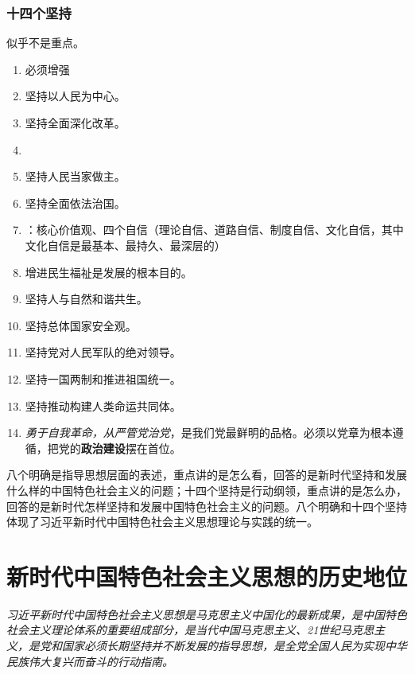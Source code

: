         \subsubsection{十四个坚持}
        似乎不是重点。
        \begin{enumerate}
            \item {}必须增强
            \item 坚持以人民为中心。
            \item 坚持全面深化改革。
            \item {}
            \item 坚持人民当家做主。
            \item 坚持全面依法治国。
            \item {}：核心价值观、四个自信（理论自信、道路自信、制度自信、文化自信，其中文化自信是最基本、最持久、最深层的）
            \item {}增进民生福祉是发展的根本目的。
            \item 坚持人与自然和谐共生。
            \item 坚持总体国家安全观。
            \item 坚持党对人民军队的绝对领导。
            \item 坚持一国两制和推进祖国统一。
            \item 坚持推动构建人类命运共同体。
            \item {}\emph{勇于自我革命，从严管党治党}，是我们党最鲜明的品格。必须以党章为根本遵循，把党的\textbf{政治建设}摆在首位。
        \end{enumerate}

    八个明确是指导思想层面的表述，重点讲的是怎么看，回答的是新时代坚持和发展什么样的中国特色社会主义的问题；十四个坚持是行动纲领，重点讲的是怎么办，回答的是新时代怎样坚持和发展中国特色社会主义的问题。八个明确和十四个坚持体现了习近平新时代中国特色社会主义思想理论与实践的统一。


\section{新时代中国特色社会主义思想的历史地位}
    \emph{习近平新时代中国特色社会主义思想是马克思主义中国化的最新成果，是中国特色社会主义理论体系的重要组成部分，是当代中国马克思主义、21世纪马克思主义，是党和国家必须长期坚持并不断发展的指导思想，是全党全国人民为实现中华民族伟大复兴而奋斗的行动指南。}
